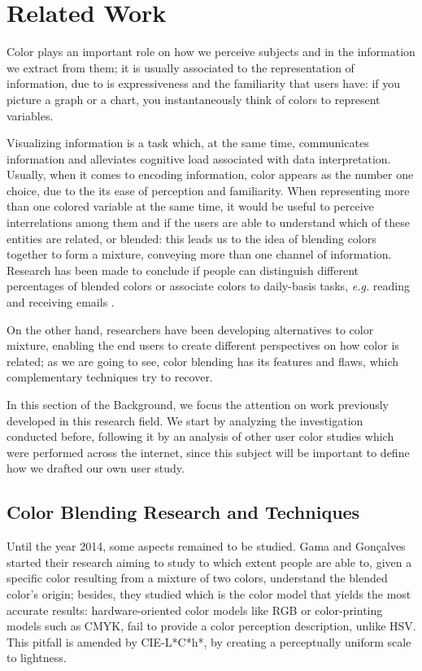 \section{Related Work}
\label{sec:related_work}
%
Color plays an important role on how we perceive subjects and in the information we extract from them; it is usually
associated to the representation of information, due to is expressiveness and the familiarity that users have: if you
picture a graph or a chart, you instantaneously think of colors to represent variables. \par
%
Visualizing information is a task which, at the same time, communicates information and alleviates
cognitive load associated with data interpretation. Usually, when it comes to encoding information, color
appears as the number one choice, due to the its ease of perception and familiarity. When representing
more than one colored variable at the same time, it would be useful to perceive interrelations among
them and if the users are able to understand which of these entities are related, or blended: this leads
us to the idea of blending colors together to form a mixture, conveying more than one channel of information.
Research has been made to conclude if people can distinguish different percentages of blended colors or
associate colors to daily-basis tasks, \emph{e.g.} reading and receiving emails \cite{Gama20143}. \par
On the other hand, researchers have been developing alternatives to color mixture, enabling the end users
to create different perspectives on how color is related; as we are going to see, color blending has its
features and flaws, which complementary techniques try to recover. \par
%
In this section of the Background, we focus the attention on work previously developed in this research field. We
start by analyzing the investigation conducted before, following it by an analysis of other user color studies
which were performed across the internet, since this subject will be important to define how we drafted our own
user study.
%
\subsection{Color Blending Research and Techniques}
\label{subsec:colorblending}
%
Until the year 2014, some aspects remained to be studied. Gama and Gonçalves started their research \cite{Gama20141}
aiming to study to which extent people are able to, given a specific color resulting from a mixture of
two colors, understand the blended color’s origin; besides, they studied which is the color model that
yields the most accurate results: hardware-oriented color models like RGB or color-printing models such
as CMYK, fail to provide a color perception description, unlike HSV. This pitfall is amended by CIE-L*C*h*,
by creating a perceptually uniform scale to lightness.  \par
%
